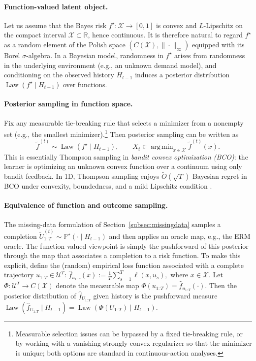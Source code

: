 \documentclass[11pt]{article}
\providecommand{\R}{\mathbb{R}}
\renewcommand{\P}{\mathbb{P}}
\DeclareMathOperator*{\argmin}{arg\,min}
\DeclareMathOperator{\Law}{Law}
\providecommand{\cU}{\mathcal{U}}
\providecommand{\cX}{\mathcal{X}}
\begin{document}
\paragraph{Function-valued latent object.}
Let us assume that the Bayes risk $f^\star:\cX\to[0,1]$ is convex and $L$-Lipschitz on the
compact interval $\cX\subset\R$, hence continuous. It is therefore natural to regard $f^\star$ as a random
element of the Polish space $(C(\cX),\|\cdot\|_\infty)$ equipped with its Borel $\sigma$-algebra.
In a Bayesian model, randomness in $f^\star$ arises from randomness in the underlying environment
(e.g., an unknown demand model), and conditioning on the observed history $H_{t-1}$ induces a posterior
distribution $\Law(f^\star\mid H_{t-1})$ over functions.

\paragraph{Posterior sampling in function space.}
Fix any measurable tie-breaking rule that selects a minimizer from a nonempty set
(e.g., the smallest minimizer).\footnote{Measurable selection issues can be bypassed by a fixed
tie-breaking rule, or by working with a vanishing strongly convex regularizer so that the minimizer is unique;
both options are standard in continuous-action analyses.}
Then posterior sampling can be written as
\begin{equation}
\label{eq:ts-function}
\widetilde f^{(t)} \sim \Law(f^\star\mid H_{t-1}),
\qquad
X_t \in \argmin_{x\in\cX}\widetilde f^{(t)}(x).
\end{equation}
This is essentially Thompson sampling in \emph{bandit convex optimization (BCO)}: the learner is optimizing an unknown convex function over a continuum using only bandit feedback. In 1D, Thompson sampling enjoys $\widetilde O(\sqrt{T})$ Bayesian regret in BCO under
convexity, boundedness, and a mild Lipschitz condition \citep{bakhtiari2025bco} .




\paragraph{Equivalence of function and outcome sampling.}
The missing-data formulation of Section~\ref{subsec:missingdata} samples a completion
$\widetilde U_{1:T}^{(t)}\sim \P^\star(\cdot\mid H_{t-1})$ and then applies an oracle map, e.g., the ERM oracle. The function-valued viewpoint is simply the pushforward of this posterior through the map that associates a completion to a risk function. To make this explicit, define the (random) empirical loss function associated with a complete trajectory
$u_{1:T}\in\cU^T$: \(\widehat f_{u_{1:T}}(x) := \frac1T\sum_{s=1}^T \ell(x,u_s),\) where \(x\in\cX. \)
Let $\Phi:\cU^T\to C(\cX)$ denote the measurable map $\Phi(u_{1:T})=\widehat f_{u_{1:T}}(\cdot)$.
Then the posterior distribution of $\widehat f_{U_{1:T}}$ given history is the pushforward measure
$\Law(\widehat f_{U_{1:T}}\mid H_{t-1}) = \Law(\Phi(U_{1:T})\mid H_{t-1})$.
\end{document}
